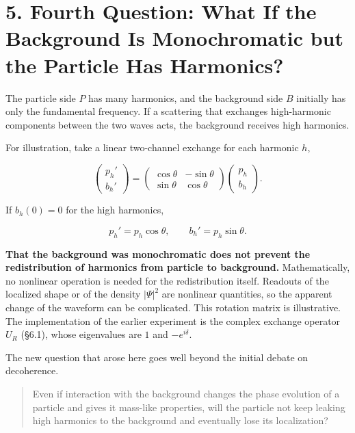 \documentclass[
  a4paper,
]{article}
\begin{document}
\section{5. Fourth Question: What If the Background Is Monochromatic but
the Particle Has
Harmonics?}\label{fourth-question-what-if-the-background-is-monochromatic-but-the-particle-has-harmonics}

The particle side \(P\) has many harmonics, and the background side
\(B\) initially has only the fundamental frequency. If a scattering that
exchanges high-harmonic components between the two waves acts, the
background receives high harmonics.

For illustration, take a linear two-channel exchange for each harmonic
\(h\),

\[
\begin{pmatrix}p_h'\\b_h'\end{pmatrix}
=
\begin{pmatrix}
\cos\theta&-\sin\theta\\
\sin\theta&\cos\theta
\end{pmatrix}
\begin{pmatrix}p_h\\b_h\end{pmatrix}.
\]

If \(b_h(0)=0\) for the high harmonics,

\[
p_h' =p_h\cos\theta,\qquad
b_h'=p_h\sin\theta.
\]

\textbf{That the background was monochromatic does not prevent the
redistribution of harmonics from particle to background.}
Mathematically, no nonlinear operation is needed for the redistribution
itself. Readouts of the localized shape or of the density \(|\Psi|^2\)
are nonlinear quantities, so the apparent change of the waveform can be
complicated. This rotation matrix is illustrative. The implementation of
the earlier experiment is the complex exchange operator \(U_R\) (§6.1),
whose eigenvalues are \(1\) and \(-e^{i\delta}\).

The new question that arose here goes well beyond the initial debate on
decoherence.

\begin{quote}
Even if interaction with the background changes the phase evolution of a
particle and gives it mass-like properties, will the particle not keep
leaking high harmonics to the background and eventually lose its
localization?
\end{quote}
\end{document}
